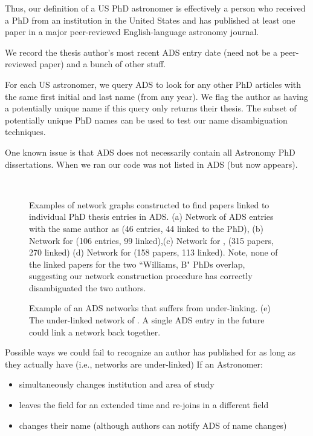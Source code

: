 \documentclass[preprint2]{aastex}
\begin{document}
Thus, our definition of a US PhD astronomer is effectively a person who received a PhD from an institution in the United States and has published at least one paper in a major peer-reviewed English-language astronomy journal.

We record the thesis author's most recent ADS entry date (need not be a peer-reviewed paper)  and a bunch of other stuff.

For each US astronomer, we query ADS to look for any other PhD articles with the same first initial and last name (from any year).  We flag the author as having a potentially unique name if this query only returns their thesis.  The subset of potentially unique PhD names can be used to test our name disambiguation techniques.

One known issue is that ADS does not necessarily contain all Astronomy PhD dissertations. When we ran our code \citet{Pagnotta12} was not listed in ADS (but now appears).


\begin{figure*}
  \\
        \caption{Examples of network graphs constructed to find papers linked to individual PhD thesis entries in ADS.   (a) Network of ADS entries with the same author as \citet{Yoachim07} (46 entries, 44 linked to the PhD), (b) Network for \citet{Bellm2011} (106 entries, 99 linked),(c) Network for \citet{Williams02}, (315 papers, 270 linked) (d) Network for \citet{Williams11} (158 papers, 113 linked).  Note, none of the linked papers for the two ``Williams, B" PhDs overlap, suggesting our network construction procedure has correctly disambiguated the two authors. \label{fig:example_networks}}
\end{figure*}

\begin{figure}
  \caption{Example of an ADS networks that suffers from under-linking.  (e) The under-linked network of \citet{Capelo12}.  A single ADS entry in the future could link a network back together. \label{fig:underlinked}}
\end{figure}


Possible ways we could fail to recognize an author has published for as long as they actually have (i.e., networks are under-linked) If an Astronomer:
\begin{itemize}
\item{simultaneously changes institution and area of study}
\item{leaves the field for an extended time and re-joins in a different field}
\item{changes their name (although authors can notify ADS of name changes)}
\end{itemize}
\end{document}
